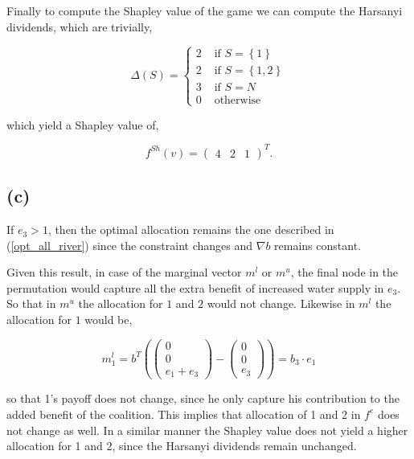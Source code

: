 \documentclass[american]{scrartcl}
\newcommand{\set}[1]{\left\{#1\right\}}
\begin{document}
Finally to compute the Shapley value of the game we can compute the Harsanyi dividends, which are trivially,

\begin{equation}
    \Delta(S)  = \begin{cases}
        2 & \text{ if } S = \set{1}    \\
        2 & \text{ if } S = \set{1, 2} \\
        3 & \text{ if } S = N          \\
        0 & \text{ otherwise }
    \end{cases}
\end{equation}

which yield a Shapley value of,

\begin{equation}
    f^{Sh}(v) = \begin{pmatrix}
        4 & 2 & 1
    \end{pmatrix}^T.
\end{equation}

\subsection*{(c)}

If $e_3 > 1$, then the optimal allocation remains the one described in (\ref{opt_all_river}) since the constraint changes and $\nabla b$ remains constant.

Given this result, in case of the marginal vector $m^l$ or $m^u$, the final node in the permutation would capture all the extra benefit of increased water supply in $e_3$. So that in $m^u$ the allocation for $1$ and $2$ would not change. Likewise in $m^l$ the allocation for $1$ would be,

\begin{equation}
    m^l_1 = b^T \left(\begin{pmatrix}
            0 \\ 0 \\ e_1 + e_3
        \end{pmatrix} - \begin{pmatrix}
            0 \\ 0 \\ e_3
        \end{pmatrix} \right) = b_3 \cdot e_1
\end{equation}

so that 1's payoff does not change, since he only capture his contribution to the added benefit of the coalition. This implies that allocation of 1 and 2 in $f^e$ does not change as well. In a similar manner the Shapley value does not yield a higher allocation for 1 and 2, since the Harsanyi dividends remain unchanged.
\end{document}
